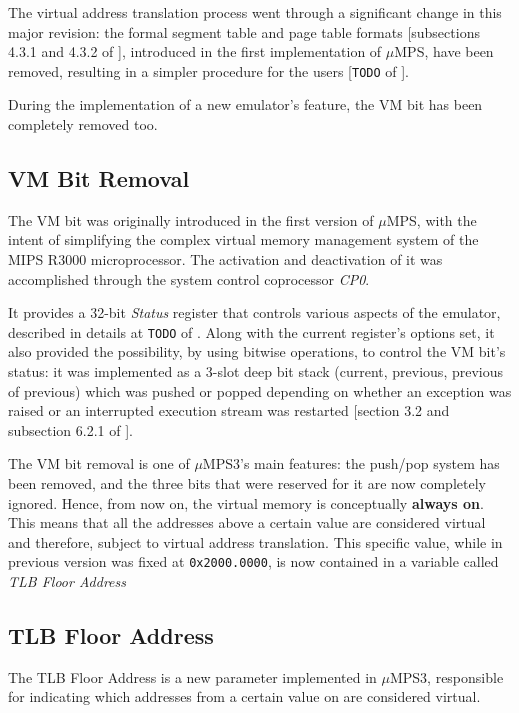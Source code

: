\documentclass[12pt,a4paper,openright,twoside]{report}
\begin{document}
The virtual address translation process went through a significant change in this major revision: the formal segment table and page table formats [subsections 4.3.1 and 4.3.2 of \cite{old_pops}], introduced in the first implementation of $\mu$MPS, have been removed, resulting in a simpler procedure for the users [\texttt{TODO} of \cite{pops}].

During the implementation of a new emulator's feature, the VM bit has been completely removed too.

\subsection{VM Bit Removal}
\label{chap:vm_bit_removal}
The VM bit was originally introduced in the first version of $\mu$MPS, with the intent of simplifying the complex virtual memory management system of the MIPS R3000 microprocessor.
The activation and deactivation of it was accomplished through the system control coprocessor \textit{CP0}.

It provides a 32-bit \textit{Status} register that controls various aspects of the emulator, described in details at \texttt{TODO} of \cite{pops}.
Along with the current register's options set, it also provided the possibility, by using bitwise operations, to control the VM bit's status: it was implemented as a 3-slot deep bit stack (current, previous, previous of previous) which was pushed or popped depending on whether an exception was raised or an interrupted execution stream was restarted [section 3.2 and subsection 6.2.1 of \cite{old_pops}].

The VM bit removal is one of $\mu$MPS3's main features: the push/pop system has been removed, and the three bits that were reserved for it are now completely ignored.
Hence, from now on, the virtual memory is conceptually \textbf{always on}.
This means that all the addresses above a certain value are considered virtual and therefore, subject to virtual address translation.
This specific value, while in previous version was fixed at \texttt{0x2000.0000}, is now contained in a variable called \textit{TLB Floor Address}

\subsection{TLB Floor Address}
\label{chap:tlb_floor_address}
The TLB Floor Address is a new parameter implemented in $\mu$MPS3, responsible for indicating which addresses from a certain value on are considered virtual.
\end{document}
